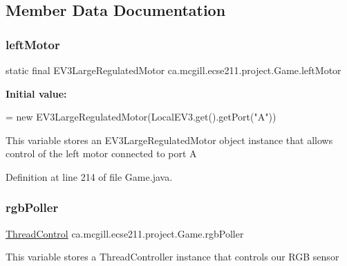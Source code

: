 \subsection{Member Data Documentation}
\mbox{\label{enumca_1_1mcgill_1_1ecse211_1_1project_1_1_game_a7c673571bf50fdb6917a9d7bb671e003}} 
\subsubsection{\texorpdfstring{left\+Motor}{leftMotor}}
{\footnotesize\ttfamily  static  final E\+V3\+Large\+Regulated\+Motor ca.\+mcgill.\+ecse211.\+project.\+Game.\+left\+Motor\hspace{0.3cm}{\ttfamily [static]}}

{\bfseries Initial value\+:}
\begin{DoxyCode}
=
      \textcolor{keyword}{new} EV3LargeRegulatedMotor(LocalEV3.get().getPort(\textcolor{stringliteral}{"A"}))
\end{DoxyCode}
This variable stores an E\+V3\+Large\+Regulated\+Motor object instance that allows control of the left motor connected to port A 

Definition at line 214 of file Game.\+java.

\mbox{\label{enumca_1_1mcgill_1_1ecse211_1_1project_1_1_game_af24a953a0c3438670220dde36c532b5d}} 
\subsubsection{\texorpdfstring{rgb\+Poller}{rgbPoller}}
{\footnotesize\ttfamily \hyperlink{classca_1_1mcgill_1_1ecse211_1_1threads_1_1_thread_control}{Thread\+Control} ca.\+mcgill.\+ecse211.\+project.\+Game.\+rgb\+Poller}

This variable stores a Thread\+Controller instance that controls our R\+GB sensor 

